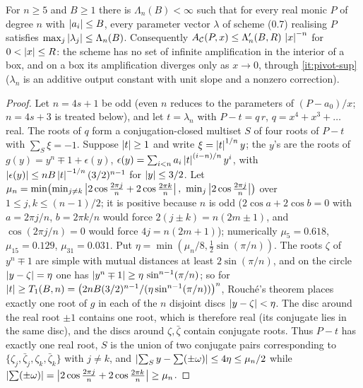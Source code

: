 \begin{lemma}
\label{lem:pan07-bounded}
For $n\ge5$ and $B\ge1$ there is $\Lambda_n(B)<\infty$ such that for every
real monic $P$ of degree $n$ with $\left\lvert a_i\right\rvert\le B$, every parameter vector
$\lambda$ of scheme (0.7) realising $P$ satisfies
$\max_j\left\lvert \lambda_j\right\rvert\le\Lambda_n(B)$.  Consequently
$A_{\mathcal C}(P,x)\le\Lambda_n'(B,R)\,\left\lvert x\right\rvert^{-n}$ for $0<\left\lvert x\right\rvert\le R$: the
scheme has no set of infinite amplification in the interior of a box, and on
a box its amplification diverges only as $x\to0$, through
\ref{it:pivot-sup} ($\lambda_n$ is an
additive output constant with unit slope and a nonzero correction).
\end{lemma}

\begin{proof}
Let $n=4s+1$ be odd (even $n$ reduces to the parameters of $(P-a_0)/x$;
$n=4s+3$ is treated below), and let $t=\lambda_n$ with
$P-t=q\,r$, $q=x^4+x^3+\dots$ real.  The roots of $q$ form a
conjugation-closed multiset $S$ of four roots of $P-t$ with $\sum_S\xi=-1$.
Suppose $\left\lvert t\right\rvert\ge1$ and write $\xi=\left\lvert t\right\rvert^{1/n}y$; the $y$'s are the roots of
$g(y)=y^n\mp1+\epsilon(y)$, $\epsilon(y)=\sum_{i<n}a_i\left\lvert t\right\rvert^{(i-n)/n}y^i$,
with $\left\lvert \epsilon(y)\right\rvert\le nB\left\lvert t\right\rvert^{-1/n}(3/2)^{n-1}$ for $\left\lvert y\right\rvert\le3/2$.
Let $\mu_n=\min\bigl(\min_{j\ne k}\left\lvert 2\cos\tfrac{2\pi j}n+2\cos\tfrac{2\pi k}n\right\rvert,
\ \min_j\left\lvert 2\cos\tfrac{2\pi j}n\right\rvert\bigr)$ over $1\le j,k\le(n-1)/2$; it is
positive because $n$ is odd ($2\cos a+2\cos b=0$ with $a=2\pi j/n$,
$b=2\pi k/n$ would force $2(j\pm k)=n(2m\pm1)$, and $\cos(2\pi j/n)=0$ would
force $4j=n(2m+1)$); numerically $\mu_5=0.618$, $\mu_{15}=0.129$,
$\mu_{31}=0.031$.  Put $\eta=\min(\mu_n/8,\tfrac12\sin(\pi/n))$.  The roots
$\zeta$ of $y^n\mp1$ are simple with mutual distances at least
$2\sin(\pi/n)$, and on the circle $\left\lvert y-\zeta\right\rvert=\eta$ one has
$\left\lvert y^n\mp1\right\rvert\ge\eta\,\sin^{n-1}(\pi/n)$; so for
$\left\lvert t\right\rvert\ge T_1(B,n)=\bigl(2nB(3/2)^{n-1}/(\eta\sin^{n-1}(\pi/n))\bigr)^n$,
Rouch\'e's theorem places exactly one root of $g$ in each of the $n$
disjoint discs $\left\lvert y-\zeta\right\rvert<\eta$.  The disc around the real root $\pm1$
contains one root, which is therefore real (its conjugate lies in the same
disc), and the discs around $\zeta,\bar\zeta$ contain conjugate roots.  Thus
$P-t$ has exactly one real root, $S$ is the union of two conjugate pairs
corresponding to $\{\zeta_j,\bar\zeta_j,\zeta_k,\bar\zeta_k\}$ with $j\ne k$,
and $\left\lvert \sum_Sy-\sum(\pm\omega)\right\rvert\le4\eta\le\mu_n/2$ while
$\left\lvert \sum(\pm\omega)\right\rvert=\left\lvert 2\cos\tfrac{2\pi j}n+2\cos\tfrac{2\pi k}n\right\rvert\ge\mu_n$.

\end{proof}
